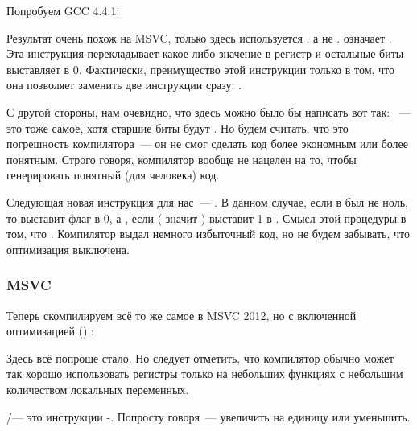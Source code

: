 Попробуем GCC 4.4.1:



\label{movzx}
Результат очень похож на MSVC, только здесь используется \MOVZX, а не \MOVSX. 
\MOVZX означает . Эта инструкция перекладывает какое-либо значение 
в регистр и остальные биты выставляет в 0.
Фактически, преимущество этой инструкции только в том, что она позволяет 
заменить две инструкции сразу: .

С другой стороны, нам очевидно, что здесь можно было бы написать вот так: 
~--- это тоже самое, хотя старшие биты \EAX будут . 
Но будем считать, что это погрешность компилятора~--- 
он не смог сделать код более экономным или более понятным. 
Строго говоря, компилятор вообще не нацелен на то, чтобы генерировать понятный (для человека) код.

Следующая новая инструкция для нас~--- \SETNZ. В данном случае, если в \AL был не ноль, 
то  выставит флаг \ZF в 0, а \SETNZ, если  
( значит ) выставит 1 в \AL. 
Смысл этой процедуры в том, что 
 .
Компилятор выдал немного избыточный код, но не будем забывать, что оптимизация выключена.

\fi

\subsubsection{\Optimizing MSVC}
\label{strlen_MSVC_Ox}

Теперь скомпилируем всё то же самое в MSVC 2012, но с включенной оптимизацией (\Ox)
:



Здесь всё попроще стало. Но следует отметить, что компилятор обычно может так хорошо использовать регистры 
только на небольших функциях с небольшим количеством локальных переменных.

\INC/\DEC --- это инструкции -. Попросту говоря~--- 
увеличить на единицу или уменьшить.

\ifdefined\IncludeOlly

\fi

